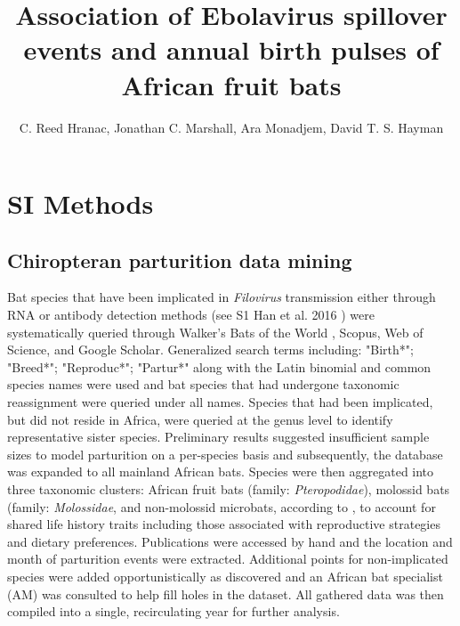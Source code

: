 \documentclass[9pt,twoside,lineno]{pnas-new}
\title{Association of Ebolavirus spillover events and annual birth pulses of African fruit bats}
\author{C. Reed Hranac, Jonathan C. Marshall, Ara Monadjem, David T. S. Hayman}
\begin{document}

\maketitle

\SItext


\section*{SI Methods}
\label{SI methods}

\subsection*{Chiropteran parturition data mining}
\label{dataMining}
Bat species that have been implicated in \textit{Filovirus} transmission either through RNA or antibody detection methods (see S1 Han et al. 2016 \cite{Han2016UndiscoveredFiloviruses,Walsh2005Wave-likeZaire}) were systematically queried through Walker's Bats of the World \cite{Nowak1994WalkersWorld}, Scopus, Web of Science, and Google Scholar. Generalized search terms including: "Birth*"; "Breed*"; "Reproduc*"; "Partur*" along with the Latin binomial and common species names were used and bat species that had undergone taxonomic reassignment were queried under all names. Species that had been implicated, but did not reside in Africa, were queried at the genus level to identify representative sister species. Preliminary results suggested insufficient sample sizes to model parturition on a per-species basis and subsequently, the database was expanded to all mainland African bats. Species were then aggregated into three taxonomic clusters: African fruit bats (family: \textit{Pteropodidae}), molossid bats (family: \textit{Molossidae}, and non-molossid microbats, according to \cite{Cumming1997RainfallBats}, to account for shared life history traits including those associated with reproductive strategies and dietary preferences. Publications were accessed by hand and the location and month of parturition events were extracted. Additional points for non-implicated species were added opportunistically as discovered and an African bat specialist (AM) was consulted to help fill holes in the dataset. All gathered data was then compiled into a single, recirculating year for further analysis.\par
\end{document}
